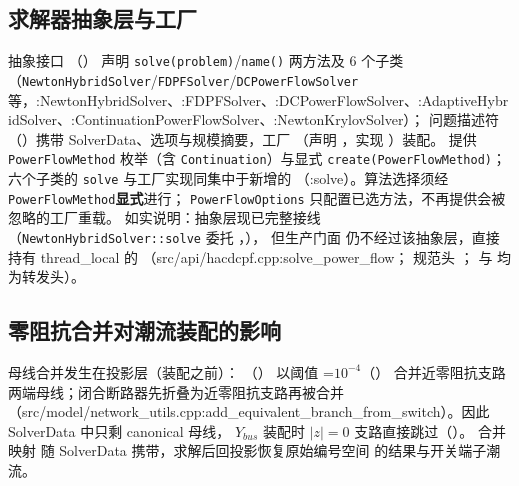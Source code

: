 \subsection{求解器抽象层与工厂}
抽象接口 （）
声明 \texttt{solve(problem)}/\texttt{name()} 两方法及 6 个子类
（\texttt{NewtonHybridSolver}/\allowbreak\texttt{FDPFSolver}/\allowbreak\texttt{DCPowerFlowSolver} 等，:NewtonHybridSolver、:FDPFSolver、:DCPowerFlowSolver、:AdaptiveHybridSolver、:ContinuationPowerFlowSolver、:NewtonKrylovSolver）；
问题描述符 （）携带
SolverData、选项与规模摘要，工厂 
（声明 ，实现
）装配。
 提供 \texttt{PowerFlowMethod} 枚举（含
\texttt{Continuation}）与显式 \texttt{create(PowerFlowMethod)}；六个子类的 \texttt{solve}
与工厂实现同集中于新增的 
（:solve）。算法选择须经 \texttt{PowerFlowMethod}\textbf{显式}进行；
\texttt{PowerFlowOptions} 只配置已选方法，不再提供会被忽略的工厂重载。
如实说明：抽象层现已完整接线（\texttt{NewtonHybridSolver::\allowbreak solve}
委托 ，），
但生产门面  仍不经过该抽象层，直接持有
thread\_local 的 （src/api/hacdcpf.cpp:solve\_power\_flow；
规范头 ；
 与 
均为转发头）。

\subsection{零阻抗合并对潮流装配的影响}
母线合并发生在投影层（装配之前）：
（）
以阈值 =$10^{-4}$（）
合并近零阻抗支路两端母线；闭合断路器先折叠为近零阻抗支路再被合并
（src/model/network\_utils.cpp:add\_equivalent\_branch\_from\_switch）。因此 SolverData 中只剩 canonical 母线，
$Y_{bus}$ 装配时 $|z|=0$ 支路直接跳过（）。
合并映射  随 SolverData 携带，求解后回投影恢复原始编号空间
的结果与开关端子潮流。


